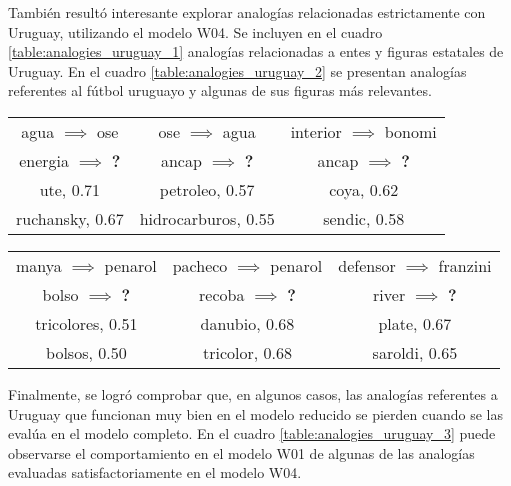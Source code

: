 
También resultó interesante explorar analogías relacionadas estrictamente con Uruguay,
utilizando el modelo W04. Se incluyen en el cuadro \ref{table:analogies_uruguay_1} analogías
relacionadas a entes y figuras estatales de Uruguay. En el cuadro \ref{table:analogies_uruguay_2} se
presentan analogías referentes al fútbol uruguayo y algunas de sus figuras más relevantes.

\begin{table*}[ht]
    \centering
    \begin{tabular}{|c|c|c|}
        \hline
        agua $\implies$ ose & ose $\implies$ agua & interior $\implies$ bonomi\\
        energia $\implies$ \textbf{?} & ancap $\implies$ \textbf{?} & ancap $\implies$ \textbf{?}\\
        \hline
        ute, 0.71 & petroleo, 0.57 & coya, 0.62\\
        ruchansky, 0.67 & hidrocarburos, 0.55 & sendic, 0.58\\
        \hline
    \end{tabular}
    \caption{Analogías relacionadas a entes públicos uruguayos.}
    \label{table:analogies_uruguay_1}
\end{table*}

\begin{table*}[ht]
    \centering
    \begin{tabular}{|c|c|c|}
        \hline
        manya $\implies$ penarol & pacheco $\implies$ penarol & defensor $\implies$ franzini\\
        bolso $\implies$ \textbf{?} & recoba $\implies$ \textbf{?} & river $\implies$ \textbf{?}\\
        \hline
        tricolores, 0.51 & danubio, 0.68 & plate, 0.67\\
        bolsos, 0.50 & tricolor, 0.68 & saroldi, 0.65\\
        \hline
    \end{tabular}
    \caption{Analogías relacionadas al fútbol uruguayo.}
    \label{table:analogies_uruguay_2}
\end{table*}

Finalmente, se logró comprobar que, en algunos casos, las analogías referentes a Uruguay que
funcionan muy bien en el modelo reducido se pierden cuando se las evalúa en el modelo completo. En
el cuadro \ref{table:analogies_uruguay_3} puede observarse el comportamiento en el modelo W01 de
algunas de las analogías evaluadas satisfactoriamente en el modelo W04.

